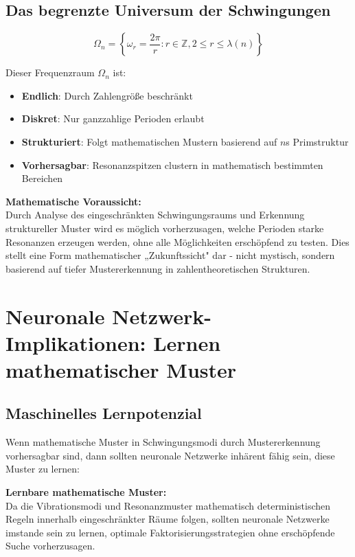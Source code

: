\documentclass[12pt,a4paper]{article}
\begin{document}
	\subsection{Das begrenzte Universum der Schwingungen}
	
	\begin{equation}
		\Omega_n = \left\{\omega_r = \frac{2\pi}{r} : r \in \mathbb{Z}, 2 \leq r \leq \lambda(n)\right\}
	\end{equation}
	
	Dieser Frequenzraum $\Omega_n$ ist:
	\begin{itemize}
		\item \textbf{Endlich}: Durch Zahlengröße beschränkt
		\item \textbf{Diskret}: Nur ganzzahlige Perioden erlaubt
		\item \textbf{Strukturiert}: Folgt mathematischen Mustern basierend auf $n$s Primstruktur
		\item \textbf{Vorhersagbar}: Resonanzspitzen clustern in mathematisch bestimmten Bereichen
	\end{itemize}
	
	\begin{tcolorbox}[colback=cyan!10,colframe=cyan!50,title=Vorhersageprinzip]
		\textbf{Mathematische Voraussicht:} \\
		Durch Analyse des eingeschränkten Schwingungsraums und Erkennung struktureller Muster wird es möglich vorherzusagen, welche Perioden starke Resonanzen erzeugen werden, ohne alle Möglichkeiten erschöpfend zu testen. Dies stellt eine Form mathematischer „Zukunftssicht" dar - nicht mystisch, sondern basierend auf tiefer Mustererkennung in zahlentheoretischen Strukturen.
	\end{tcolorbox}
	
	\section{Neuronale Netzwerk-Implikationen: Lernen mathematischer Muster}
	
	\subsection{Maschinelles Lernpotenzial}
	
	Wenn mathematische Muster in Schwingungsmodi durch Mustererkennung vorhersagbar sind, dann sollten neuronale Netzwerke inhärent fähig sein, diese Muster zu lernen:
	
	\begin{tcolorbox}[colback=green!10,colframe=green!50,title=Neuronales Netzwerk-Hypothese]
		\textbf{Lernbare mathematische Muster:} \\
		Da die Vibrationsmodi und Resonanzmuster mathematisch deterministischen Regeln innerhalb eingeschränkter Räume folgen, sollten neuronale Netzwerke imstande sein zu lernen, optimale Faktorisierungsstrategien ohne erschöpfende Suche vorherzusagen.
	\end{tcolorbox}
	
\end{document}
